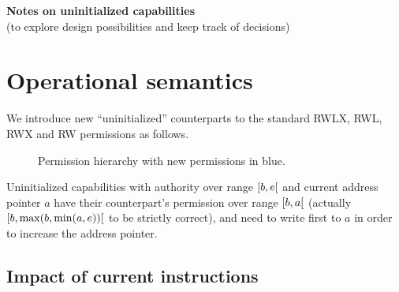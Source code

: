 \documentclass[a4paper, 10pt]{article}
\theoremstyle{remark}
\begin{document}
\lhead{}
\rhead{}
\renewcommand{\headrulewidth}{0pt} 
\renewcommand{\footrulewidth}{0pt}

\newcommand\code[1]{\textsf{#1}}

\begin{center}
  {\LARGE \bf Notes on uninitialized capabilities}\\
  {\small (to explore design possibilities and keep track of decisions)}
\end{center}

\section{Operational semantics}

We introduce new ``uninitialized'' counterparts to the standard RWLX, RWL, RWX and RW permissions as follows.

\begin{figure}[!h]
  \begin{center}
  \end{center}
  \caption{Permission hierarchy with new permissions in {\color{blue} blue}.}
\end{figure}

Uninitialized capabilities with authority over range $\interval[open right]{b}{e}$ and current address pointer $a$ have their counterpart's permission over range $\interval[open right]{b}{a}$ (actually $\interval[open right]{b}{\max(b, \min(a, e))}$ to be strictly correct), and need to write first to $a$ in order to increase the address pointer.

\subsection{Impact of current instructions}
\end{document}
